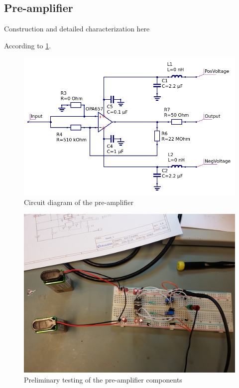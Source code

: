 \documentclass[a4paper]{article}
\begin{document}
\clearpage
\begin{appendices}

\section{Pre-amplifier}
\label{pre_amp}

Construction and detailed characterization here

According to \ref{fig:pre_amp_schematic}.

\begin{figure}[ht!]
\centering
\includegraphics[width=\textwidth]{fig/amp-schematic/amplifier.png}
\caption{Circuit diagram of the pre-amplifier}
\label{fig:pre_amp_schematic}
\end{figure}


\begin{figure}[ht!]
\centering
\includegraphics[width=\textwidth]{fig/IMG_20201005_104331.jpg}
\caption{Preliminary testing of the pre-amplifier components}
\end{figure}



\end{appendices}
\end{document}
